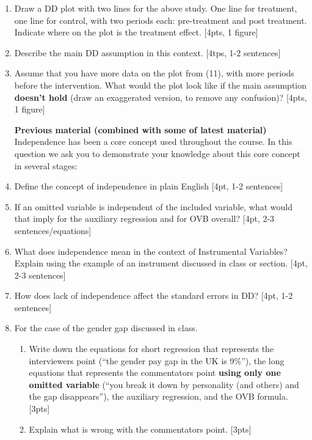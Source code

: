 \documentclass[answers]{exam}
\begin{document}
\begin{enumerate}
\item Draw a DD plot with two lines for the above study. One line for treatment, one line for control, with two periods each: pre-treatment and post treatment. Indicate where on the plot is the treatment effect. [4pts, 1 figure]
\vspace{6cm}

 

\clearpage
\item Describe the main DD assumption in this context. [4tps, 1-2 sentences]
\vspace{2cm}


\item Assume that you have more data on the plot from (11), with more periods before the intervention. What would the plot look like if the main assumption \textbf{doesn't hold} (draw an exaggerated version, to remove any confusion)? [4pts, 1 figure]
\vspace{8cm}


\textbf{Previous material (combined with some of latest material)}
Independence has been a core concept used throughout the course. In this question we
ask you to demonstrate your knowledge about this core concept in several stages:
\item Define the concept of independence in plain English [4pt, 1-2 sentences]
\vspace{3cm}





\item If an omitted variable is independent of the included variable, what would that imply for the auxiliary regression and for OVB overall? [4pt, 2-3 sentences/equations]
\vspace{4cm}

\newpage

\item What does independence mean in the context of Instrumental Variables? Explain using the example of an instrument discussed in class or section. [4pt, 2-3 sentences]
\vspace{4cm}


\item How does lack of independence affect the standard errors in DD? [4pt, 1-2
sentences]
\vspace{3cm}

\item For the case of the gender gap discussed in class.
\begin{enumerate}
\item Write down the equations for short regression that represents the interviewers point (``the gender pay gap in the UK is 9\%''), the long equations that represents the commentators point \textbf{using only one omitted variable} (``you break it down by personality (and others) and the gap disappears''), the auxiliary regression, and the OVB formula. [3pts]

\vspace{5cm}
\item Explain what is wrong with the commentators point. [3pts]
\end{enumerate}


\end{enumerate}
\end{document}

